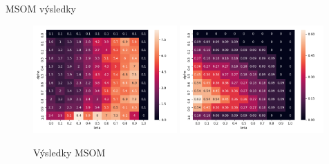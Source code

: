 \documentclass[10pt]{beamer}
\begin{document}
\begin{frame}[fragile]{MSOM výsledky}

  \begin{figure}[H]
   \centering
   \includegraphics[width=0.49\textwidth]{assets/m_memory_span}
   \includegraphics[width=0.49\textwidth]{assets/m_errors}
   \caption{Výsledky MSOM}
 \end{figure}


\end{frame}

\end{document}
